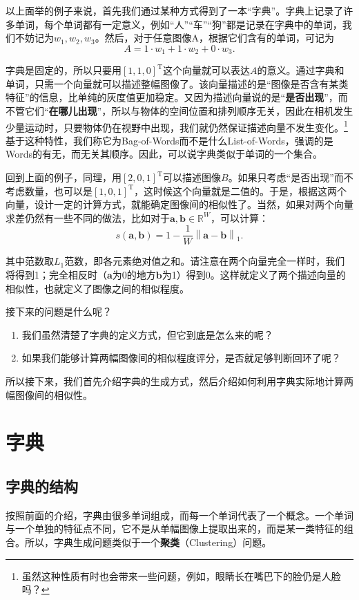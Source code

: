 以上面举的例子来说，首先我们通过某种方式得到了一本“字典”。字典上记录了许多单词，每个单词都有一定意义，例如“人”“车”“狗”都是记录在字典中的单词，我们不妨记为$w_1, w_2, w_3$。然后，对于任意图像A，根据它们含有的单词，可记为
\begin{equation}
A = 1 \cdot w_1+1\cdot w_2 + 0 \cdot w_3.
\end{equation}

字典是固定的，所以只要用$[1,1,0]^\mathrm{T}$这个向量就可以表达$A$的意义。通过字典和单词，只需一个向量就可以描述整幅图像了。该向量描述的是“图像是否含有某类特征”的信息，比单纯的灰度值更加稳定。又因为描述向量说的是“\textbf{是否出现}”，而不管它们“\textbf{在哪儿出现}”，所以与物体的空间位置和排列顺序无关，因此在相机发生少量运动时，只要物体仍在视野中出现，我们就仍然保证描述向量不发生变化。\footnote{虽然这种性质有时也会带来一些问题，例如，眼睛长在嘴巴下的脸仍是人脸吗？} 基于这种特性，我们称它为Bag-of-Words而不是什么List-of-Words，强调的是Words的有无，而无关其顺序。因此，可以说字典类似于单词的一个集合。

回到上面的例子，同理，用$[2,0,1]^\mathrm{T}$可以描述图像$B$。如果只考虑“是否出现”而不考虑数量，也可以是$[1,0,1]^\mathrm{T}$，这时候这个向量就是二值的。于是，根据这两个向量，设计一定的计算方式，就能确定图像间的相似性了。当然，如果对两个向量求差仍然有一些不同的做法，比如对于$\bm{a}, \bm{b} \in \mathbb{R}^W$，可以计算：
\begin{equation}
s\left( {\bm{a},\bm{b}} \right) = 1 - \frac{1}{W}\left\| {\bm{a} - \bm{b}} \right\|_1.
\end{equation}

其中范数取$L_1$范数，即各元素绝对值之和。请注意在两个向量完全一样时，我们将得到1；完全相反时（$\bm{a}$为0的地方$\bm{b}$为1）得到0。这样就定义了两个描述向量的相似性，也就定义了图像之间的相似程度。

接下来的问题是什么呢？

\begin{enumerate}
	\item 我们虽然清楚了字典的定义方式，但它到底是怎么来的呢？
	\item 如果我们能够计算两幅图像间的相似程度评分，是否就足够判断回环了呢？
\end{enumerate}

所以接下来，我们首先介绍字典的生成方式，然后介绍如何利用字典实际地计算两幅图像间的相似性。

\section{字典}
\subsection{字典的结构}
按照前面的介绍，字典由很多单词组成，而每一个单词代表了一个概念。一个单词与一个单独的特征点不同，它不是从单幅图像上提取出来的，而是某一类特征的组合。所以，字典生成问题类似于一个\textbf{聚类}（Clustering）问题。

